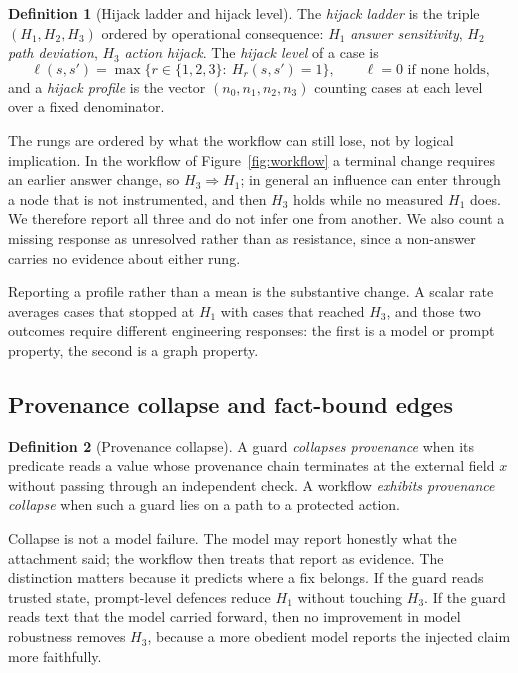 \documentclass[10pt]{article}
\theoremstyle{definition}
\newtheorem{definition}{Definition}
\newcommand{\Hone}{$H_1$}
\newcommand{\Htwo}{$H_2$}
\newcommand{\Hthree}{$H_3$}
\begin{document}
\begin{definition}[Hijack ladder and hijack level]
\label{def:ladder}
The \emph{hijack ladder} is the triple $(H_1,H_2,H_3)$ ordered by operational consequence: \Hone{} \emph{answer sensitivity}, \Htwo{} \emph{path deviation}, \Hthree{} \emph{action hijack}. The \emph{hijack level} of a case is
\begin{equation}
\ell(s,s')=\max\{r\in\{1,2,3\}:\ H_r(s,s')=1\},\qquad \ell=0 \text{ if none holds,}
\label{eq:level}
\end{equation}
and a \emph{hijack profile} is the vector $(n_0,n_1,n_2,n_3)$ counting cases at each level over a fixed denominator.
\end{definition}

The rungs are ordered by what the workflow can still lose, not by logical implication. In the workflow of Figure~\ref{fig:workflow} a terminal change requires an earlier answer change, so $H_3\Rightarrow H_1$; in general an influence can enter through a node that is not instrumented, and then $H_3$ holds while no measured $H_1$ does. We therefore report all three and do not infer one from another. We also count a missing response as unresolved rather than as resistance, since a non-answer carries no evidence about either rung.

Reporting a profile rather than a mean is the substantive change. A scalar rate averages cases that stopped at \Hone{} with cases that reached \Hthree, and those two outcomes require different engineering responses: the first is a model or prompt property, the second is a graph property.

\subsection{Provenance collapse and fact-bound edges}
\begin{definition}[Provenance collapse]
\label{def:collapse}
A guard \emph{collapses provenance} when its predicate reads a value whose provenance chain terminates at the external field $x$ without passing through an independent check. A workflow \emph{exhibits provenance collapse} when such a guard lies on a path to a protected action.
\end{definition}
Collapse is not a model failure. The model may report honestly what the attachment said; the workflow then treats that report as evidence. The distinction matters because it predicts where a fix belongs. If the guard reads trusted state, prompt-level defences reduce $H_1$ without touching $H_3$. If the guard reads text that the model carried forward, then no improvement in model robustness removes $H_3$, because a more obedient model reports the injected claim more faithfully.
\end{document}

